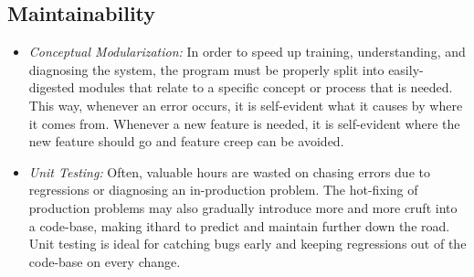 \documentclass[titlepage, 12pt]{extarticle}
\begin{document}
\subsection{Maintainability}
\begin{itemize}
\item {\it Conceptual Modularization:} In order to speed up training, understanding, and diagnosing the system, the program must be properly split into easily-digested modules that relate to a specific concept or process that is needed. This way, whenever an error occurs, it is self-evident what it causes by where it comes from. Whenever a new feature is needed, it is self-evident where the new feature should go and feature creep can be avoided.
\item {\it Unit Testing:} Often, valuable hours are wasted on chasing errors due to regressions or diagnosing an in-production problem. The hot-fixing of production problems may also gradually introduce more and more cruft into a code-base, making ithard to predict and maintain further down the road. Unit testing is ideal for catching bugs early and keeping regressions out of the code-base on every change.
\end{itemize}
\end{document}
